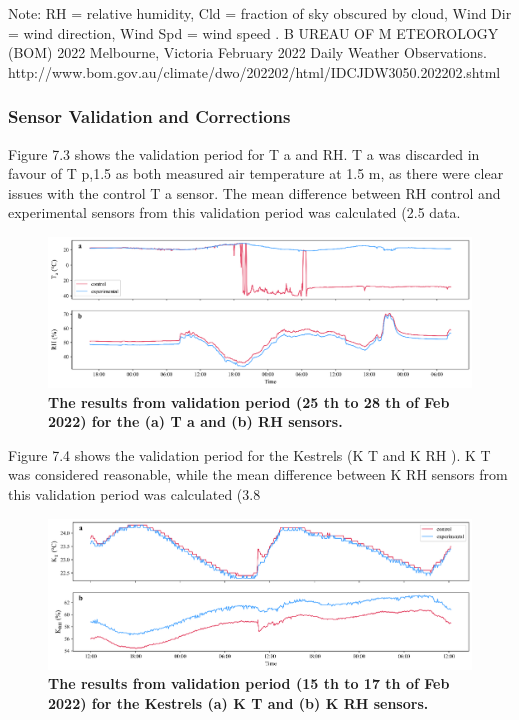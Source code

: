 \documentclass[final,3p,times,authoryear]{elsarticle}
\begin{document}
Note: RH = relative humidity, Cld = fraction of sky obscured by cloud, Wind Dir = wind direction,
Wind Spd = wind speed .
B UREAU OF M ETEOROLOGY (BOM) 2022 Melbourne, Victoria February 2022 Daily Weather
Observations.
http://www.bom.gov.au/climate/dwo/202202/html/IDCJDW3050.202202.shtml





\subsubsection{Sensor Validation and Corrections}\label{sec:appendix7.3}

Figure 7.3 shows the validation period for T a and RH. T a was discarded in favour of
T p,1.5 as both measured air temperature at 1.5 m, as there were clear issues with the
control T a sensor. The mean difference between RH control and experimental sensors
from this validation period was calculated (2.5 %
data.

\begin{figure}
\centering
\includegraphics[trim={0 0 0 0},clip,scale=1.0]{pict018.png}
\caption{\bf The results from validation period (25 th to 28 th of Feb 2022) for the (a) T a and (b) RH sensors.}
 \label{fig:7.3}
\end{figure}

Figure 7.4 shows the validation period for the Kestrels (K T and K RH ). K T was considered
reasonable, while the mean difference between K RH sensors from this validation period
was calculated (3.8 %

\begin{figure}
\centering
\includegraphics[trim={0 0 0 0},clip,scale=1.0]{pict019.png}
\caption{\bf The results from validation period (15 th to 17 th of Feb 2022) for the Kestrels (a) K T and (b)
K RH sensors.}
 \label{fig:7.4}
\end{figure}
\end{document}
